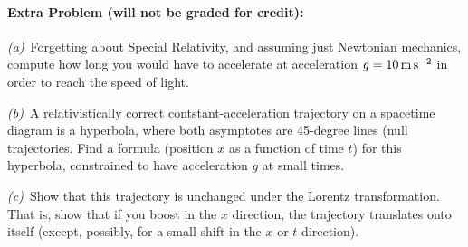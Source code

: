 \documentclass[12pt]{article}
\begin{document}
\paragraph{Extra Problem (will not be graded for credit):}%
\textsl{(a)}~Forgetting about Special Relativity, and assuming just
Newtonian mechanics, compute how long you would have to accelerate at
acceleration $g=10\,\mathrm{m}\,\mathrm{s}^{-2}$ in order to reach the speed of light.

\textsl{(b)}~A relativistically correct contstant-acceleration
trajectory on a spacetime diagram is a hyperbola, where both
asymptotes are 45-degree lines (null trajectories. Find a formula
(position $x$ as a function of time $t$) for this hyperbola,
constrained to have acceleration $g$ at small times.

\textsl{(c)}~Show that this trajectory is unchanged under the Lorentz
transformation. That is, show that if you boost in the $x$ direction,
the trajectory translates onto itself (except, possibly, for a small
shift in the $x$ or $t$ direction).
\end{document}
